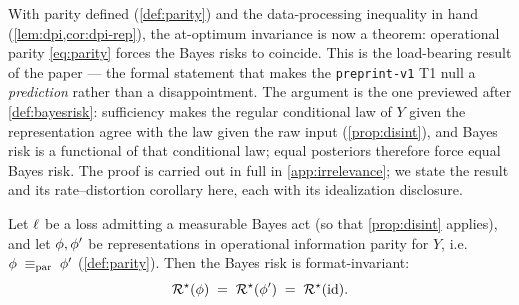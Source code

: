 With parity defined (\cref{def:parity}) and the data-processing inequality in
hand (\cref{lem:dpi,cor:dpi-rep}), the at-optimum invariance is now a theorem:
operational parity \eqref{eq:parity} forces the Bayes risks to coincide. This
is the load-bearing result of the paper --- the formal statement that makes the
\texttt{preprint-v1} T1 null a \emph{prediction} rather than a
disappointment. The argument is the one previewed after \cref{def:bayesrisk}:
sufficiency makes the regular conditional law of $Y$ given the representation
agree with the law given the raw input (\cref{prop:disint}), and Bayes risk is
a functional of that conditional law; equal posteriors therefore force equal
Bayes risk. The proof is carried out in full in \cref{app:irrelevance}; we
state the result and its rate--distortion corollary here, each with its
idealization disclosure.

\begin{theorem}
\label{thm:irrelevance}
Let $\ell$ be a loss admitting a measurable Bayes act (so that
\cref{prop:disint} applies), and let $\phi,\phi'$ be representations in
operational information parity for $Y$, i.e.\ $\phi \;\equiv_{\mathrm{par}}\; \phi'$
(\cref{def:parity}). Then the Bayes risk is format-invariant:
\begin{equation}
  \label{eq:irrelevance}
  \mathcal{R}^{\star}(\phi) \;=\; \mathcal{R}^{\star}(\phi') \;=\; \mathcal{R}^{\star}(\mathrm{id}).
\end{equation}
\end{theorem}

